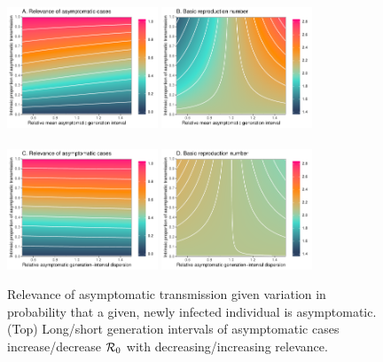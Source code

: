 \begin{figure}[b!]
\begin{center}
\includegraphics[width=0.4\textwidth]{figheatmap.pdf}
\mbox{\hspace{0.05\textwidth}}
\includegraphics[width=0.4\textwidth]{figheatmap_R0.pdf}\\
\mbox{}\\
\includegraphics[width=0.4\textwidth]{figheatmap_kappa.pdf}
\mbox{\hspace{0.05\textwidth}}
\includegraphics[width=0.4\textwidth]{figheatmap_kappa_R0.pdf}
\caption{Relevance of asymptomatic transmission given variation in
probability that a given, newly infected individual is asymptomatic. (Top) Long/short generation intervals of asymptomatic cases increase/decrease ${\cal{R}}_0$ with decreasing/increasing relevance.
}
\end{center}
\end{figure}
